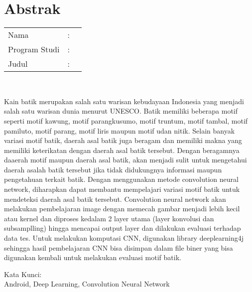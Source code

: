 %
%
%

\chapter*{Abstrak}

\vspace*{0.2cm}

\noindent \begin{tabular}{l l p{10cm}}
	Nama&: & \penulis \\
	Program Studi&: & \program \\
	Judul&: & \judul \\
\end{tabular} \\ 

\vspace*{0.5cm}

\noindent Kain batik merupakan salah satu warisan kebudayaan Indonesia yang menjadi salah satu warisan dunia menurut UNESCO. Batik memiliki beberapa motif seperti motif kawung, motif parangkusumo, motif truntum, motif tambal, motif pamiluto, motif parang, motif liris maupun motif udan nitik. Selain banyak variasi motif batik, daerah asal batik juga beragam dan memiliki makna yang memiliki keterikatan dengan daerah asal batik tersebut. Dengan beragamnya daaerah motif maupun daerah asal batik, akan menjadi sulit untuk mengetahui daerah asalah batik tersebut jika tidak didukungnya informasi maupun pengetahuan terkait batik. Dengan menggunakan metode convolution neural network, diharapkan dapat membantu mempelajari variasi motif batik untuk mendeteksi daerah asal batik tersebut. Convolution neural network akan melakukan pembelajaran image dengan memecah gambar menjadi lebih kecil atau kernel dan diproses kedalam 2 layer utama (layer konvolusi dan subsamplling) hingga mencapai output layer dan dilakukan evaluasi terhadap data tes. Untuk melakukan komputasi CNN, digunakan library deeplearning4j sehingga hasil pembelajaran CNN bisa disimpan dalam file biner yang bisa digunakan kembali untuk melakukan evaluasi motif batik.   \\

\vspace*{0.2cm}

\noindent Kata Kunci: \\ 
\noindent Android, Deep Learning, Convolution Neural Network \\

\newpage